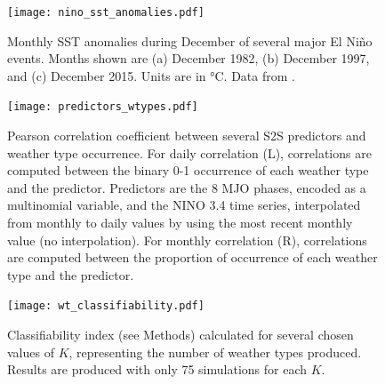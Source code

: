 \documentclass{article}
\begin{document}
\begin{figure}
	\texttt{[image: nino\_sst\_anomalies.pdf]}
	\caption{
		Monthly SST anomalies during December of several major El Ni\~{n}o events.
		Months shown are (a) December 1982, (b) December 1997, and (c) December 2015.
		Units are in \si{\celsius}.
		Data from \citet{Reynolds2002}.
	}
\end{figure}

\begin{figure}
	\texttt{[image: predictors\_wtypes.pdf]}
	\caption{
		Pearson correlation coefficient between several S2S predictors and weather type occurrence.
		For daily correlation (L), correlations are computed between the binary 0-1 occurrence of each weather type and the predictor.
		Predictors are the 8 MJO phases, encoded as a multinomial variable, and the NINO 3.4 time series, interpolated from monthly to daily values by using the most recent monthly value (no interpolation).
		For monthly correlation (R), correlations are computed between the proportion of occurrence of each weather type and the predictor.
	}
\end{figure}

\begin{figure}
	\texttt{[image: wt\_classifiability.pdf]}
	  \caption{
		  Classifiability index (see Methods) calculated for several chosen values of $K$, representing the number of weather types produced.
		  Results are produced with only 75 simulations for each $K$.
	  }
  \end{figure}

\clearpage


\end{document}
